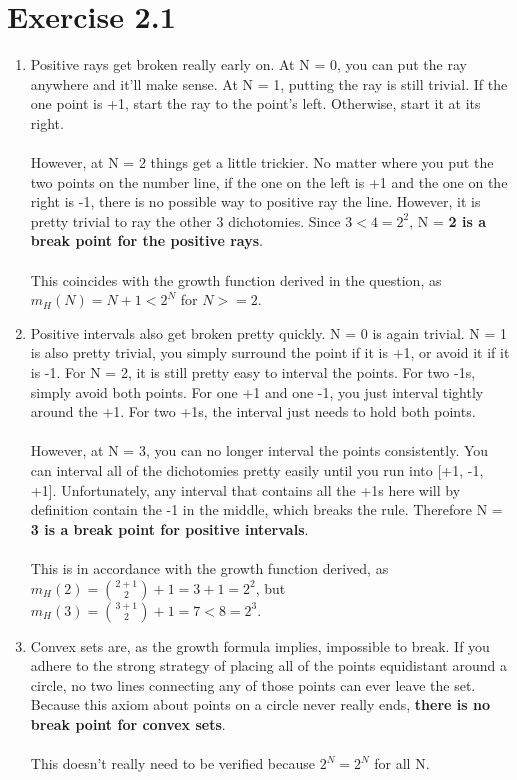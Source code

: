 \documentclass[12pt]{article}
\begin{document}
\section*{Exercise 2.1}
\begin{enumerate}[label=(\alph*)]
	\item Positive rays get broken really early on. At N = 0, you can put the ray anywhere and it'll make sense. At N = 1, putting the ray is still trivial. If the one point is +1, start the ray to the point's left. Otherwise, start it at its right.
	\\ \\ However, at N = 2 things get a little trickier. No matter where you put the two points on the number line, if the one on the left is +1 and the one on the right is -1, there is no possible way to positive ray the line. However, it is pretty trivial to ray the other 3 dichotomies. Since $3 < 4 = 2^2$, N = \textbf{2 is a break point for the positive rays}.
	\\ \\ This coincides with the growth function derived in the question, as $m_H(N) = N + 1 < 2^N$ for $N >= 2$.
	\item Positive intervals also get broken pretty quickly. N = 0 is again trivial. N = 1 is also pretty trivial, you simply surround the point if it is +1, or avoid it if it is -1. For N = 2, it is still pretty easy to interval the points. For two -1s, simply avoid both points. For one +1 and one -1, you just interval tightly around the +1. For two +1s, the interval just needs to hold both points.
	\\ \\ However, at N = 3, you can no longer interval the points consistently. You can interval all of the dichotomies pretty easily until you run into [+1, -1, +1]. Unfortunately, any interval that contains all the +1s here will by definition contain the -1 in the middle, which breaks the rule. Therefore N = \textbf{3 is a break point for positive intervals}.
	\\ \\ This is in accordance with the growth function derived, as $m_H(2) = \binom{2+1}{2} + 1 = 3 + 1 = 2^2$, but $m_H(3) = \binom{3+1}{2} + 1 = 7 < 8 = 2^3$.
	\item Convex sets are, as the growth formula implies, impossible to break. If you adhere to the strong strategy of placing all of the points equidistant around a circle, no two lines connecting any of those points can ever leave the set. Because this axiom about points on a circle never really ends, \textbf{there is no break point for convex sets}.
	\\ \\ This doesn't really need to be verified because $2^N = 2^N$ for all N.
\end{enumerate}
\end{document}
